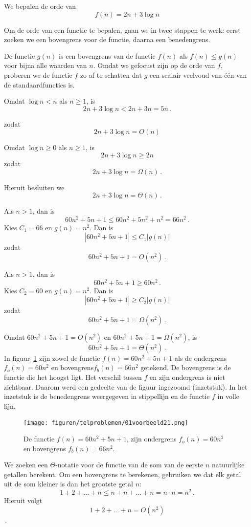 \voorbeeld

We bepalen de orde van 
\[
f(n)=2n+3\log n
\]

Om de orde van een functie te bepalen, gaan we in twee stappen te werk: eerst zoeken we een bovengrens voor de functie, daarna een benedengrens.

De functie $g(n)$ is een bovengrens van de functie $f(n)$ als $f(n)\leq g(n)$ voor bijna alle waarden van $n$. Omdat we gefocust zijn op de orde van $f$, proberen we de functie $f$ zo af te schatten dat $g$ een scalair veelvoud van één van de standaardfuncties is.

Omdat $\log n<n$  als $n\geq1$, is 
\[2n+3\log n <2n+3n=5n\,.\] 


zodat 
\[2n+3\log n=O(n)\] 

Omdat  $\log n\geq0$ als $n\geq1$, is 
\[2n+3\log n \geq 2n\] 
zodat
\[2n+3\log n =\Omega(n)\,.\] 

Hieruit besluiten we
\[2n+3\log n =\Theta(n)\,.\]

\voorbeeld
\label{vb:1}
Als $n>1$, dan is
\[
60n^2+5n+1\leq60n^2+5n^2+n^2=66n^2\,.
\]
Kies $C_1=66$ en $g(n)=n^2$. Dan is 
\[
|60n^2+5n+1|\leq C_1|g(n)|
\]
zodat 
\[60n^2+5n+1=O(n^2)\,.
\] 

Als $n>1$, dan is
\[
60n^2+5n+1\geq60n^2\,.
\]
Kies $C_2=60$ en $g(n)=n^2$. Dan is 
\[
|60n^2+5n+1|\geq C_2|g(n)|
\]
zodat 
\[60n^2+5n+1=\Omega(n^2)\,.
\] 

Omdat $60n^2+5n+1=O(n^2)$ en $60n^2+5n+1=\Omega(n^2)$, is 
\[
60n^2+5n+1=\Theta(n^2)\,.
\]
In figuur~\ref{fig:vb21} zijn zowel de functie $f(n)=60n^2+5n+1$ als de ondergrens $f_o(n)=60n^2$ en bovengrens$f_b(n)=66n^2$ getekend. De bovengrens is de functie die het hoogst ligt. Het verschil tussen $f$ en zijn ondergrens is niet zichtbaar. Daarom werd een gedeelte van de figuur ingezoomd (inzetstuk). In het inzetstuk is de benedengrens weergegeven in stippellijn en de functie $f$ in volle lijn.
\begin{figure}[htbp]
\begin{center}
\texttt{[image: figuren/telproblemen/01voorbeeld21.png]}
\caption{De functie $f(n)=60n^2+5n+1$, zijn ondergrens $f_o(n)=60n^2$ en bovengrens  $f_b(n)=66n^2$. }
\label{fig:vb21}
\end{center}
\end{figure}


\voorbeeld
We zoeken een $\Theta$-notatie voor de functie van de som van de eerste $n$ natuurlijke getallen berekent.
Om een bovengrens te berekenen, gebruiken we dat elk getal uit de som kleiner is dan het grootste getal $n$:
\[
1+2+\dots+n\leq n+n+\ldots+n=n\cdot n=n^2\,.
\]
Hieruit volgt
\[1+2+\dots+n=O(n^2)\]\,.

